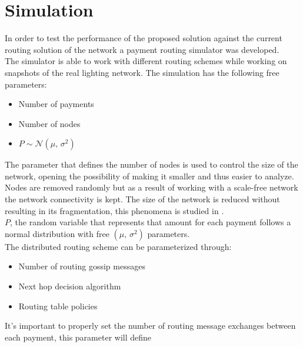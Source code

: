 \section{Simulation}

In order to test the performance of the proposed solution against the current routing solution of the network a payment routing simulator was developed. \\
The simulator is able to work with different routing schemes while working on snapshots of the real lighting network. The simulation has the following free parameters:

\begin{itemize}
    \item Number of payments
    \item Number of nodes
    \item $P \sim \mathcal{N}(\mu,\,\sigma^{2})$
\end{itemize}

The parameter that defines the number of nodes is used to control the size of the network, opening the possibility of making it smaller and thus easier to analyze. Nodes are removed randomly but as a result of working with a scale-free network the network connectivity is kept. The size of the network is reduced without resulting in its fragmentation, this phenomena is studied in \cite{network_science}. \\
$P$, the random variable that represents that amount for each payment follows a normal distribution with free $(\mu,\,\sigma^{2})$ parameters. \\
The distributed routing scheme can be parameterized through:

\begin{itemize}
    \item Number of routing gossip messages
    \item Next hop decision algorithm
    \item Routing table policies
\end{itemize}

It's important to properly set the number of routing message exchanges between each payment, this parameter will define 